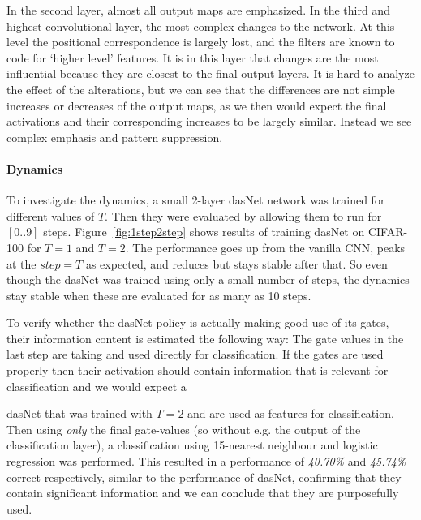 In the second layer, almost all output maps are
emphasized. In the third and highest convolutional layer, the most
complex changes to the network. At this level the
positional correspondence is largely lost, and the filters are known
to code for `higher level' features. It is in this layer that changes
are the most influential because they are closest to the final output
layers. 
It is hard to analyze the effect of the alterations, but we
can see that the differences are not simple increases or decreases of
the output maps, as we then would expect the final activations and
their corresponding increases to be largely similar. Instead we see
complex emphasis and pattern suppression.

\paragraph{Dynamics} To investigate the dynamics, a small 2-layer dasNet
network was trained for different values of $T$. Then they were evaluated
by allowing them to run for $[0..9]$ steps.
Figure~\ref{fig:1step2step} shows results of training dasNet on CIFAR-100 for $T=1$ and $T=2$.
The performance goes up from the vanilla CNN, peaks at the $step = T$ as
expected, and reduces but stays stable after that.
So even though the dasNet was trained using only a small number of steps,
the dynamics stay stable when these are evaluated for as many as 10 steps.

To verify whether the dasNet policy is actually making good use of its gates,
their information content is estimated the following way:
The gate values in the last step are taking and used directly for classification.
If the gates are used properly then their activation should contain information that is relevant for classification
and we would expect a

dasNet that was trained with $T=2$ and are used as
features for classification. Then using \emph{only} the final gate-values (so without e.g. the output of the classification layer), 
a classification using 15-nearest neighbour and logistic regression was performed. This
resulted in a performance of \emph{40.70\%} and \emph{45.74\%} correct
respectively, similar to the performance of dasNet, confirming that
they contain significant information and we can conclude that they are purposefully used.

